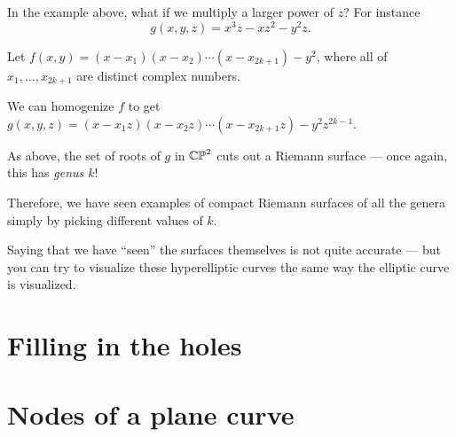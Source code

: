 \begin{exercise}
	In the example above, what if we multiply a larger power of $z$? For instance
	\[ g(x, y, z) = x^3 z-xz^2-y^2 z. \]
\end{exercise}

\begin{example}
	Let $f(x, y) = (x-x_1)(x-x_2) \dotsm (x-x_{2k+1}) - y^2$, where all of $x_1, \dots, x_{2k+1}$ are
	distinct complex numbers.

	We can homogenize $f$ to get $g(x, y, z) = (x-x_1 z)(x-x_2 z) \dotsm (x-x_{2k+1} z) - y^2
	z^{2k-1}$.

	As above, the set of roots of $g$ in $\mathbb{CP}^2$ cuts out a Riemann surface --- once again, this has
	\emph{genus $k$}!

	Therefore, we have seen examples of compact Riemann surfaces of all the genera simply by picking
	different values of $k$.
\end{example}
Saying that we have ``seen'' the surfaces themselves is not quite accurate ---
but you can try to visualize these hyperelliptic curves the same way the elliptic curve is
visualized.

\section{Filling in the holes}

\section{Nodes of a plane curve}
